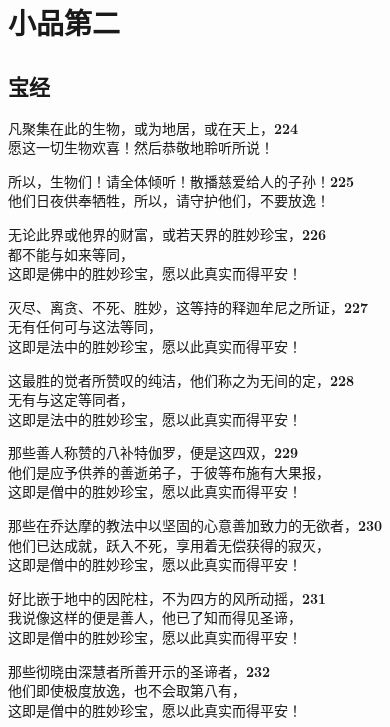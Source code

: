 \chapter{小品第二}

\section{宝经}


凡聚集在此的生物，或为地居，或在天上，\hfill{\grayfootnotesize \textbf{224}} \\
愿这一切生物欢喜！然后恭敬地聆听所说！


所以，生物们！请全体倾听！散播慈爱给人的子孙！\hfill{\grayfootnotesize \textbf{225}} \\
他们日夜供奉牺牲，所以，请守护他们，不要放逸！


无论此界或他界的财富，或若天界的胜妙珍宝，\hfill{\grayfootnotesize \textbf{226}} \\
都不能与如来等同，\\
这即是佛中的胜妙珍宝，愿以此真实而得平安！


灭尽、离贪、不死、胜妙，这等持的释迦牟尼之所证，\hfill{\grayfootnotesize \textbf{227}} \\
无有任何可与这法等同，\\
这即是法中的胜妙珍宝，愿以此真实而得平安！


这最胜的觉者所赞叹的纯洁，他们称之为无间的定，\hfill{\grayfootnotesize \textbf{228}} \\
无有与这定等同者，\\
这即是法中的胜妙珍宝，愿以此真实而得平安！


那些善人称赞的八补特伽罗，便是这四双，\hfill{\grayfootnotesize \textbf{229}} \\
他们是应予供养的善逝弟子，于彼等布施有大果报，\\
这即是僧中的胜妙珍宝，愿以此真实而得平安！


那些在乔达摩的教法中以坚固的心意善加致力的无欲者，\hfill{\grayfootnotesize \textbf{230}} \\
他们已达成就，跃入不死，享用着无偿获得的寂灭，\\
这即是僧中的胜妙珍宝，愿以此真实而得平安！


好比嵌于地中的因陀柱，不为四方的风所动摇，\hfill{\grayfootnotesize \textbf{231}} \\
我说像这样的便是善人，他已了知而得见圣谛，\\
这即是僧中的胜妙珍宝，愿以此真实而得平安！


那些彻晓由深慧者所善开示的圣谛者，\hfill{\grayfootnotesize \textbf{232}} \\
他们即使极度放逸，也不会取第八有，\\
这即是僧中的胜妙珍宝，愿以此真实而得平安！


